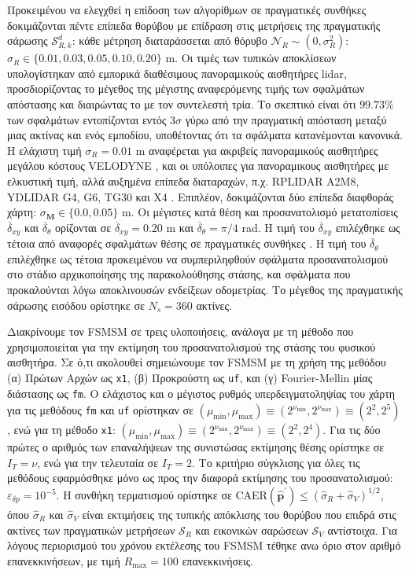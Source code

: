 Προκειμένου να ελεγχθεί η επίδοση των αλγορίθμων σε πραγματικές συνθήκες
δοκιμάζονται πέντε επίπεδα θορύβου με επίδραση στις μετρήσεις της πραγματικής
σάρωσης $\mathcal{S}_{R,k}^d$: κάθε μέτρηση διαταράσσεται από θόρυβο
$\mathcal{N}_{R} \sim (0, \sigma_{R}^2)$: $\sigma_R \in \{0.01, 0.03, 0.05,
0.10, 0.20\}$ m. Οι τιμές των τυπικών αποκλίσεων υπολογίστηκαν από εμπορικά
διαθέσιμους πανοραμικούς αισθητήρες lidar, προσδιορίζοντας το μέγεθος της
μέγιστης αναφερόμενης τιμής των σφαλμάτων απόστασης και διαιρώντας το με τον
συντελεστή τρία. Το σκεπτικό είναι ότι $99.73\%$ των σφαλμάτων εντοπίζονται
εντός $3\sigma$ γύρω από την πραγματική απόσταση μεταξύ μιας ακτίνας και ενός
εμποδίου, υποθέτοντας ότι τα σφάλματα κατανέμονται κανονικά. Η ελάχιστη τιμή
$\sigma_R = 0.01$ m αναφέρεται για ακριβείς πανοραμικούς αισθητήρες μεγάλου
κόστους VELODYNE \cite{velodyne_datasheet}, και οι υπόλοιπες για πανοραμικους
αισθητήρες με ελκυστική τιμή, αλλά αυξημένα επίπεδα διαταραχών, π.χ. RPLIDAR
A2M8, YDLIDAR G4, G6, TG30 και X4 \cite{a2m8_datasheet,ydlidar}. Επιπλέον,
δοκιμάζονται δύο επίπεδα διαφθοράς χάρτη: $\sigma_{\bm{M}} \in \{0.0, 0.05\}$
m.  Οι μέγιστες κατά θέση και προσανατολισμό μετατοπίσεις
$\overline{\delta}_{xy}$ και $\overline{\delta}_{\theta}$ ορίζονται σε
$\overline{\delta}_{xy} = 0.20$ m και $\overline{\delta}_\theta = \pi / 4$ rad.
Η τιμή του $\overline{\delta}_{xy}$ επιλέχθηκε ως τέτοια από αναφορές σφαλμάτων
θέσης σε πραγματικές συνθήκες \cite{Peng2018a}. Η τιμή του
$\overline{\delta}_\theta$ επιλέχθηκε ως τέτοια προκειμένου να συμπεριληφθούν
σφάλματα προσανατολισμού στο στάδιο αρχικοποίησης της παρακολούθησης στάσης,
και σφάλματα που προκαλούνται λόγω αποκλινουσών ενδείξεων οδομετρίας. Το
μέγεθος της πραγματικής σάρωσης εισόδου ορίστηκε σε $N_s=360$ ακτίνες.

Διακρίνουμε τον FSMSM σε τρεις υλοποιήσεις, ανάλογα με τη μέθοδο που
χρησιμοποιείται για την εκτίμηση του προσανατολισμού της στάσης του φυσικού
αισθητήρα. Σε ό,τι ακολουθεί σημειώνουμε τον FSMSM με τη χρήση της μεθόδου (α)
Πρώτων Αρχών ως \texttt{x1}, (β) Προκρούστη ως \texttt{uf}, και (γ)
Fourier-Mellin μίας διάστασης ως \texttt{fm}. Ο ελάχιστος και ο μέγιστος ρυθμός
υπερδειγματοληψίας του χάρτη για τις μεθόδους \texttt{fm} και \texttt{uf}
ορίστηκαν σε $(\mu_{\min},\mu_{\max}) \equiv (2^{\nu_{\min}},2^{\nu_{\max}})
\equiv (2^2,2^5)$, ενώ για τη μέθοδο \texttt{x1}: $(\mu_{\min},\mu_{\max})
\equiv (2^{\nu_{\min}},2^{\nu_{\max}}) \equiv (2^2,2^4)$. Για τις δύο πρώτες ο
αριθμός των επαναλήψεων της συνιστώσας εκτίμησης θέσης ορίστηκε σε $I_T=\nu$,
ενώ για την τελευταία σε $I_T = 2$.  Το κριτήριο σύγκλισης για όλες τις
μεθόδους εφαρμόσθηκε μόνο ως προς την διαφορά εκτίμησης του προσανατολισμού:
$\varepsilon_{\delta p} = 10^{-5}$.  Η συνθήκη τερματισμού ορίστηκε σε
CAER$(\hat{\bm{p}}^\prime) \leq (\hat{\sigma}_R + \hat{\sigma}_V)^{1/2}$, όπου
$\hat{\sigma}_R$ και $\hat{\sigma}_V$ είναι εκτιμήσεις της τυπικής απόκλισης
του θορύβου που επιδρά στις ακτίνες των πραγματικών μετρήσεων $\mathcal{S}_R$
και εικονικών σαρώσεων $\mathcal{S}_V$ αντίστοιχα. Για λόγους περιορισμού του
χρόνου εκτέλεσης του FSMSM τέθηκε ανω όριο στον αριθμό επανεκκινήσεων, με τιμή
$R_{\max} = 100$ επανεκκινήσεις.

